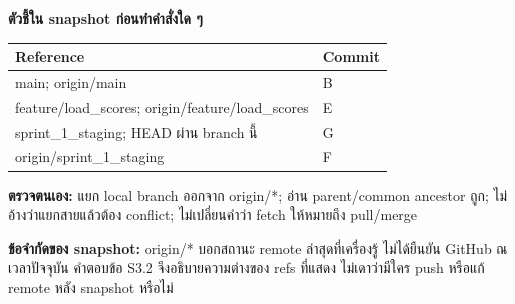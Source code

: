 \par\medskip
\textbf{ตัวชี้ใน snapshot ก่อนทำคำสั่งใด ๆ}\par
\begin{tabularx}{\linewidth}{|Y|>{\centering\arraybackslash}m{2.2cm}|}\hline
Reference & Commit\\\hline
main; origin/main & B\\\hline
feature/load\_scores; origin/feature/load\_scores & E\\\hline
sprint\_1\_staging; HEAD ผ่าน branch นี้ & G\\\hline
origin/sprint\_1\_staging & F\\\hline
\end{tabularx}
\par\medskip
\textbf{ตรวจตนเอง:} แยก local branch ออกจาก origin/*; อ่าน parent/common ancestor ถูก; ไม่อ้างว่าแยกสายแล้วต้อง conflict; ไม่เปลี่ยนคำว่า fetch ให้หมายถึง pull/merge\par
\textbf{ข้อจำกัดของ snapshot:} origin/* บอกสถานะ remote ล่าสุดที่เครื่องรู้ ไม่ได้ยืนยัน GitHub ณ เวลาปัจจุบัน คำตอบข้อ S3.2 จึงอธิบายความต่างของ refs ที่แสดง ไม่เดาว่ามีใคร push หรือแก้ remote หลัง snapshot หรือไม่\par
\fi
